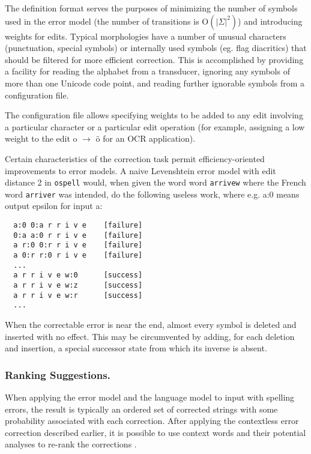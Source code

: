 \documentclass{llncs}
\begin{document}
The definition format serves the purposes of minimizing the number of symbols
used in the error model (the number of transitions is $\mathrm{O}(|\Sigma|^2)$)
and introducing weights for edits. Typical
morphologies have a number of unusual characters (punctuation, special symbols)
or internally used symbols (eg. flag diacritics) that should be filtered for
more efficient correction. This is accomplished by providing a facility for
reading the alphabet from a transducer, ignoring any symbols of more than
one Unicode code point, and reading further ignorable symbols from a
configuration file.

The configuration file allows specifying weights to be added to any edit
involving a particular character or a particular edit operation (for example,
assigning a low weight to the edit o $\rightarrow$ ö for an OCR application).

Certain characteristics of the correction task permit
efficiency-oriented improvements to error models. A naive Levenshtein
error model with edit distance 2 in \verb!ospell! would, when given
the word word \verb!arrivew! where the French word \verb!arriver! was
intended, do the following useless work, where e.g. a:0 means output
epsilon for input a:

{\footnotesize
\begin{verbatim}
  a:0 0:a r r i v e    [failure]
  0:a a:0 r r i v e    [failure]
  a r:0 0:r r i v e    [failure]
  a 0:r r:0 r i v e    [failure]
  ...
  a r r i v e w:0      [success]
  a r r i v e w:z      [success]
  a r r i v e w:r      [success]
  ...
\end{verbatim}
}

When the correctable error is near the end, almost every symbol is deleted and
inserted with no effect. This may be circumvented by adding, for each deletion
and insertion, a special successor state from which its inverse is absent.

\subsubsection{Ranking Suggestions.}

When applying the error model and the language model to input with spelling errors,
the result is typically an ordered set of corrected strings with some probability
associated with each correction. After applying the contextless error correction
described earlier, it is possible to use context words and their potential
analyses to re-rank the corrections \cite{pirinen/2012/cicling}.
\end{document}
